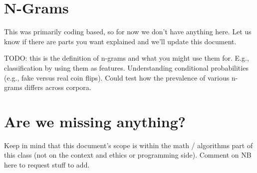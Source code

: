 \documentclass{tufte-handout}
\begin{document}
\ei



\section{N-Grams}
This was primarily coding based, so for now we don't have anything here.  Let us know if there are parts you want explained and we'll update this document.

TODO: this is the definition of n-grams and what you might use them for.  E.g., classification by using them as features.  Understanding conditional probabilities (e.g., fake versus real coin flips).  Could test how the prevalence of various n-grams differs across corpora.

\section{Are we missing anything?}
Keep in mind that this document's scope is within the math / algorithms part of this class (not on the context and ethics or programming side).  Comment on NB here to request stuff to add. 
\end{document}
